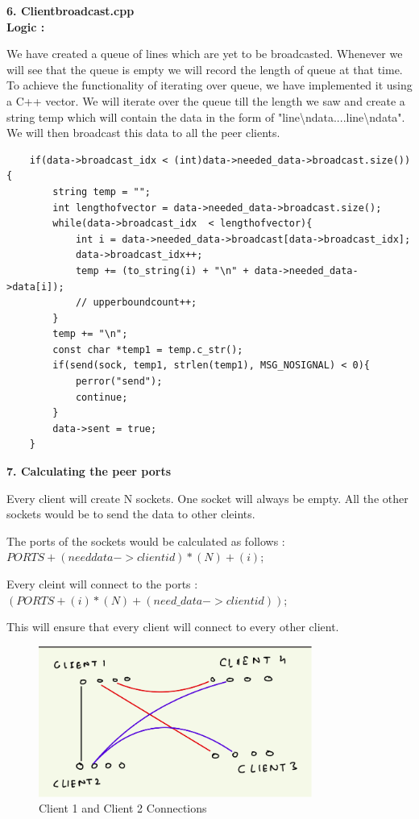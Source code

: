 \documentclass[12pt]{scrartcl}
\begin{document}
\textbf{6. Clientbroadcast.cpp}\\
\textbf{Logic : }
\par We have created a queue of lines which are yet to be broadcasted. Whenever we will see that the queue is empty we will record the length of queue at that time. To achieve the functionality of iterating over queue, we have implemented it using a C++ vector. We will iterate over the queue till the length we saw and create a string temp which will contain the data in the form of "line\textbackslash ndata....line\textbackslash ndata". We will then broadcast this data to all the peer clients.\\
\begin{verbatim}
    if(data->broadcast_idx < (int)data->needed_data->broadcast.size()){
        string temp = "";
        int lengthofvector = data->needed_data->broadcast.size();
        while(data->broadcast_idx  < lengthofvector){
            int i = data->needed_data->broadcast[data->broadcast_idx];
            data->broadcast_idx++;
            temp += (to_string(i) + "\n" + data->needed_data->data[i]);
            // upperboundcount++;
        }
        temp += "\n";
        const char *temp1 = temp.c_str();
        if(send(sock, temp1, strlen(temp1), MSG_NOSIGNAL) < 0){
            perror("send");
            continue;
        }
        data->sent = true;
    }
\end{verbatim}

\textbf{7. Calculating the peer ports}\\
\par Every client will create N sockets. One socket will always be empty. All the other sockets would be to send the data to other cleints.\\
\par The ports of the sockets would be calculated as follows :\\  $PORTS + (needdata->clientid) * (N) + (i)$;\\
\par Every cleint will connect to the ports :\\ $(PORTS + (i) * (N) + (need\_data->clientid))$;\\
\par This will ensure that every client will connect to every other client.\\

\begin{figure}[H]
    \centering
    \includegraphics[width=0.8\textwidth]{images/Screenshot from 2023-09-05 11-44-09.png}
    \caption{Client 1 and Client 2 Connections}
    \label{fig:my_label}
\end{figure}
\end{document}
